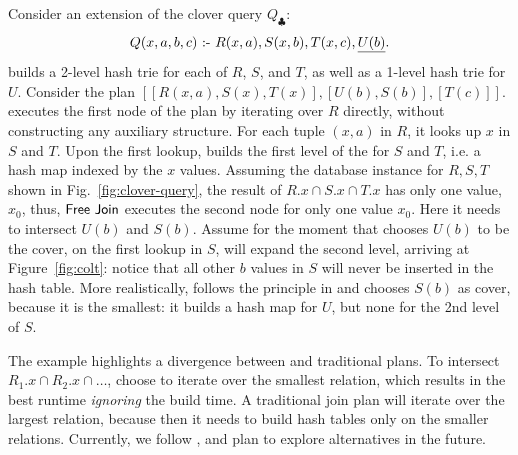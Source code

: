 \begin{ex}\label{ex:colt-clover}
Consider an extension of the clover query $Q_\clubsuit$:
\begin{align*}
  Q(x, a, b, c) \text{ :- } R(x,a), S(x,b), T(x, c), \underline{U(b)}.
\end{align*}
%
\GJ builds a 2-level hash trie for each of $R$, $S$, and $T$, as well
as a 1-level hash trie for $U$.  Consider the \FJ plan
$[[R(x,a),S(x),T(x)],[U(b),S(b)],[T(c)]]$.  \FJ executes the first
node of the plan by iterating over $R$ directly, without constructing
any auxiliary structure. For each tuple $(x, a)$ in $R$, it looks up
$x$ in $S$ and $T$.  Upon the first lookup, \COLT builds the first
level of the \GHT for $S$ and $T$, i.e. a hash map indexed by the $x$
values.  Assuming the database instance for $R,S,T$ shown in
Fig.~\ref{fig:clover-query}, the result of $R.x \cap S.x \cap T.x$ has
only one value, $x_0$, thus, $\textsf{Free Join}$ executes the second node for only
one value $x_0$.  Here it needs to intersect $U(b)$ and $S(b)$.
Assume for the moment that \FJ chooses $U(b)$ to be the cover, on the
first lookup in $S$, \COLT will expand the second level, arriving at
Figure~\ref{fig:colt}: notice that all other $b$ values in $S$ will
never be inserted in the hash table.  More realistically, \FJ follows
the principle in \GJ and chooses $S(b)$ as cover, because it is the
smallest: it builds a hash map for $U$, but none for the 2nd level of
$S$.
\end{ex}

The example highlights a divergence between \GJ and traditional plans.
To intersect $R_1.x \cap R_2.x \cap \ldots$, \GJ choose to iterate
over the smallest relation, which results in the best runtime {\em
  ignoring} the build time.  A traditional join plan will iterate over
the largest relation, because then it needs to build hash tables only
on the smaller relations.  Currently, we follow \GJ, and plan to
explore alternatives in the future.




